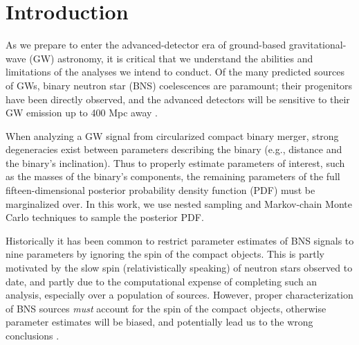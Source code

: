 \section{Introduction}

As we prepare to enter the advanced-detector era of ground-based gravitational-wave (GW) astronomy, it is critical that we understand the abilities and limitations of the analyses we intend to conduct.  Of the many predicted sources of GWs, binary neutron star (BNS) coelescences are paramount; their progenitors have been directly observed, and the advanced detectors will be sensitive to their GW emission up to 400 Mpc away \citep{2013arXiv1304.0670L}.

When analyzing a GW signal from circularized compact binary merger, strong degeneracies exist between parameters describing the binary (e.g., distance and the binary's inclination).  Thus to properly estimate parameters of interest, such as the masses of the binary's components, the remaining parameters of the full fifteen-dimensional posterior probability density function (PDF) must be marginalized over.  In this work, we use nested sampling  and Markov-chain Monte Carlo \citep{Christensen_2003,R_ver_2006,van_der_Sluys_2008} techniques to sample the posterior PDF.

Historically it has been common to restrict parameter estimates of BNS signals to nine parameters by ignoring the spin of the compact objects.  This is partly motivated by the slow spin (relativistically speaking) of neutron stars observed to date, and partly due to the computational expense of completing such an analysis, especially over a population of sources.  However, proper characterization of BNS sources \emph{must} account for the spin of the compact objects, otherwise parameter estimates will be biased, and potentially lead us to the wrong conclusions \citep{Buonanno_2009}.

